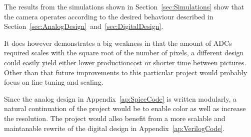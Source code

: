 The results from the simulations shown in Section~\ref{sec:Simulations} show that the camera
operates according to the desired behaviour described in Section~\ref{sec:AnalogDesign}~and~\ref{sec:DigitalDesign}.

It does however demonstrates a big weakness in that the amount of ADCs required scales with
the square root of the number of pixels, a different design could easily yield either
lower productioncost or shorter time between pictures.
Other than that future improvements to this particular project would probably focus on fine tuning and scaling.

Since the analog design in Appendix~\ref{ap:SpiceCode} is written modularly, a natural continuation of the project would be to enable color as well as increase the resolution.
The project would allso benefit from a more scalable and maintanable rewrite of the digital design in Appendix~\ref{ap:VerilogCode}.